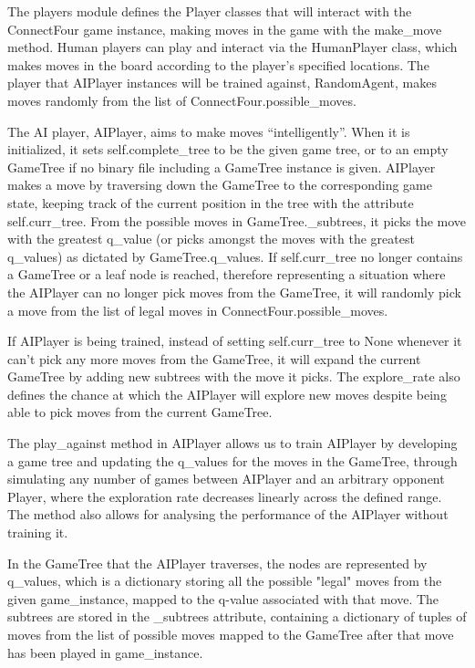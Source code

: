 \documentclass{article}
\begin{document}
\bigskip

The players module defines the Player classes that will interact with the ConnectFour game instance, making moves in the game with the make\_move method. Human players can play and interact via the HumanPlayer class, which makes moves in the board according to the player's specified locations. The player that AIPlayer instances will be trained against, RandomAgent, makes moves randomly from the list of ConnectFour.possible\_moves. 

The AI player, AIPlayer, aims to make moves ``intelligently''. When it is initialized, it sets self.complete\_tree to be the given game tree, or to an empty GameTree if no binary file including a GameTree instance is given. AIPlayer makes a move by traversing down the GameTree to the corresponding game state, keeping track of the current position in the tree with the attribute self.curr\_tree. From the possible moves in GameTree.\_subtrees, it picks the move with the greatest q\_value (or picks amongst the moves with the greatest q\_values) as dictated by GameTree.q\_values. If self.curr\_tree no longer contains a GameTree or a leaf node is reached, therefore representing a situation where the AIPlayer can no longer pick moves from the GameTree, it will randomly pick a move from the list of legal moves in ConnectFour.possible\_moves.

If AIPlayer is being trained, instead of setting self.curr\_tree to None whenever it can't pick any more moves from the GameTree, it will expand the current GameTree by adding new subtrees with the move it picks. The explore\_rate also defines the chance at which the AIPlayer will explore new moves despite being able to pick moves from the current GameTree.

The play\_against method in AIPlayer allows us to train AIPlayer by developing a game tree and updating the q\_values for the moves in the GameTree, through simulating any number of games between AIPlayer and an arbitrary opponent Player, where the exploration rate decreases linearly across the defined range. The method also allows for analysing the performance of the AIPlayer without training it.

\bigskip

In the GameTree that the AIPlayer traverses, the nodes are represented by q\_values, which is a dictionary storing all the possible "legal" moves from the given game\_instance, mapped to the q-value associated with that move. The subtrees are stored in the \_subtrees attribute, containing a dictionary of tuples of moves from the list of possible moves mapped to the GameTree after that move has been played in game\_instance.
\end{document}

